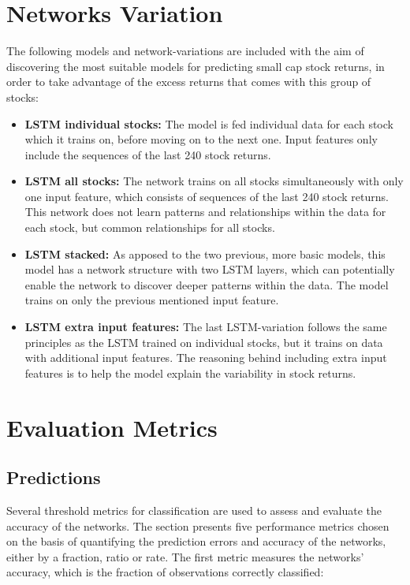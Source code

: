 \section{Networks Variation}
The following models and network-variations are included with the aim of discovering the most suitable models for predicting small cap stock returns, in order to take advantage of the excess returns that comes with this group of stocks:

\indent \newline
\begin{itemize}
\item {\textbf{LSTM individual stocks:} The model is fed individual data for each stock which it trains on, before moving on to the next one. Input features only include the sequences of the last 240 stock returns.} 
\item {\textbf{LSTM all stocks:} The network trains on all stocks simultaneously with only one input feature, which consists of sequences of the last 240 stock returns. This network does not learn patterns and relationships within the data for each stock, but common relationships for all stocks.} 
\item {\textbf{LSTM stacked:} As apposed to the two previous, more basic models, this model has a network structure with two LSTM layers, which can potentially enable the network to discover deeper patterns within the data. The model trains on only the previous mentioned input feature.}
\item {\textbf{LSTM extra input features:} The last LSTM-variation follows the same principles as the LSTM trained on individual stocks, but it trains on data with additional input features. The reasoning behind including extra input features is to help the model explain the variability in stock returns.}
\end{itemize}

\section{Evaluation Metrics}
\subsection{Predictions}
Several threshold metrics for classification are used to assess and evaluate the accuracy of the networks. The section presents five performance metrics chosen on the basis of quantifying the prediction errors and accuracy of the networks, either by a fraction, ratio or rate. The first metric measures the networks' accuracy, which is the fraction of observations correctly classified:

